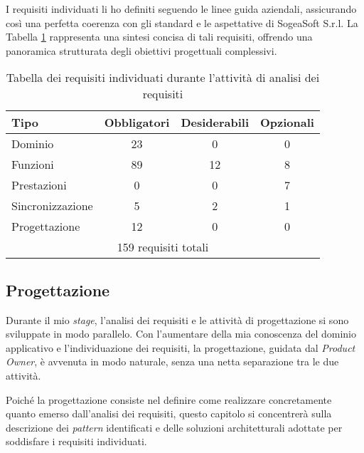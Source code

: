         \vspace{0.2 em}
        \noindent I requisiti individuati li ho definiti seguendo le linee guida aziendali, assicurando così una perfetta coerenza con gli standard e le aspettative di SogeaSoft S.r.l. La Tabella \ref{tab:requisiti} rappresenta una sintesi concisa di tali requisiti, offrendo una panoramica strutturata degli obiettivi progettuali complessivi. 

        \begin{table}[H]
        \centering
        \renewcommand{\arraystretch}{1.8} %
        \begin{tabular}{|l|c|c|c|}
        \hline
        \rowcolor[gray]{0.95}
        \textbf{Tipo} & \textbf{Obbligatori} & \textbf{Desiderabili} & \textbf{Opzionali} \\
        \hline
        Dominio & 23 & 0 & 0 \\
        \hline
        Funzioni & 89 & 12 & 8 \\
        \hline
        Prestazioni & 0 & 0 & 7 \\
        \hline
        Sincronizzazione & 5 & 2 & 1 \\
        \hline
        Progettazione & 12 & 0 & 0 \\
        \hline
        \multicolumn{4}{|c|}{159 requisiti totali}\\
        \hline
        \end{tabular}
        \caption[Tabella dei requisiti individuati]{Tabella dei requisiti individuati durante l'attività di analisi dei requisiti}
        \label{tab:requisiti}
        \end{table}

        \subsection{Progettazione}
        Durante il mio \textit{stage}, l'analisi dei requisiti e le attività di progettazione si sono sviluppate in modo parallelo. Con l'aumentare della mia conoscenza del dominio applicativo e l'individuazione dei requisiti, la progettazione, guidata dal \textit{Product Owner}, è avvenuta in modo naturale, senza una netta separazione tra le due attività.  

        \vspace{0.2 em}
        \noindent Poiché la progettazione consiste nel definire come realizzare concretamente quanto emerso dall'analisi dei requisiti, questo capitolo si concentrerà sulla descrizione dei \textit{pattern} identificati e delle soluzioni architetturali adottate per soddisfare i requisiti individuati.

